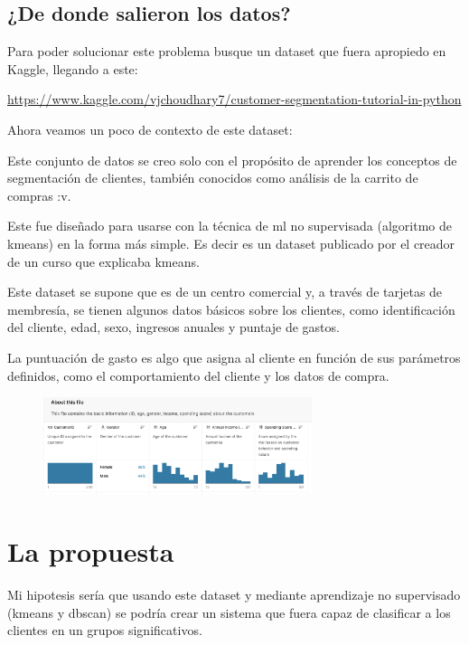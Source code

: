 \documentclass[12pt, fleqn]{report}                             %
\newcommand \Quote              {\qq}                           %
\theoremstyle{break}                                            %
\begin{document}
    \section{¿De donde salieron los datos?}
        Para poder solucionar este problema busque un dataset que fuera apropiedo en 
        Kaggle, llegando a este:

        \url{https://www.kaggle.com/vjchoudhary7/customer-segmentation-tutorial-in-python}

        Ahora veamos un poco de contexto de este dataset:

        Este conjunto de datos se creo solo con el propósito de aprender los conceptos de 
        segmentación de clientes, también conocidos como análisis de la carrito de compras :v. 

        Este fue diseñado para usarse con la técnica de ml no supervisada (algoritmo de kmeans) en la forma más simple.
        Es decir es un dataset \Quote{didactico} publicado por el creador de un curso que explicaba kmeans. 

        Este dataset se supone que es de un centro comercial y, a través de tarjetas de membresía, 
        se tienen algunos datos básicos sobre los clientes, como identificación del cliente, 
        edad, sexo, ingresos anuales y puntaje de gastos.

        La puntuación de gasto es algo que asigna al cliente en función de sus parámetros definidos,
        como el comportamiento del cliente y los datos de compra.

        \begin{figure}[ht!]
            \centering
            \includegraphics[width=0.7\textwidth]{x}
        \end{figure}

    \chapter{La propuesta}
        Mi hipotesis sería que usando este dataset y 
        mediante aprendizaje no supervisado (kmeans y dbscan) se podría crear un sistema que fuera capaz de clasificar
        a los clientes en un grupos significativos.
\end{document}
